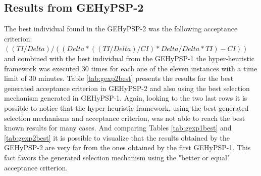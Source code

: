 \documentclass[conference]{IEEEtran}
\begin{document}
\begin{table}[]
	\centering
	\caption{Results from the best individual found in GEHyPSP-1}
	\label{tab:gexp1best}
\end{table}

\subsection{Results from GEHyPSP-2}

The best individual found in the GEHyPSP-2 was the following acceptance criterion:  $( ( TI / Delta ) / ( ( Delta * ( ( TI / Delta ) / CI ) * Delta / Delta * TI ) - CI ) )$ and combined with the best individual from the GEHyPSP-1 the hyper-heuristic framework was executed 30 times for each one of the eleven instances with a time limit of 30 minutes. Table \ref{tab:gexp2best} presents the results for the best generated acceptance criterion in GEHyPSP-2 and also using the best selection mechanism generated in GEHyPSP-1. Again, looking to the two last rows it is possible to notice that the hyper-heuristic framework, using the best generated selection mechanisms and acceptance criterion, was not able to reach the best known results for many cases. And comparing Tables \ref{tab:gexp1best} and \ref{tab:gexp2best} it is possible to visualize that the results obtained by the GEHyPSP-2 are very far from the ones obtained by the first GEHyPSP-1. This fact favors the generated selection mechanism using the "better or equal" acceptance criterion.
\end{document}
